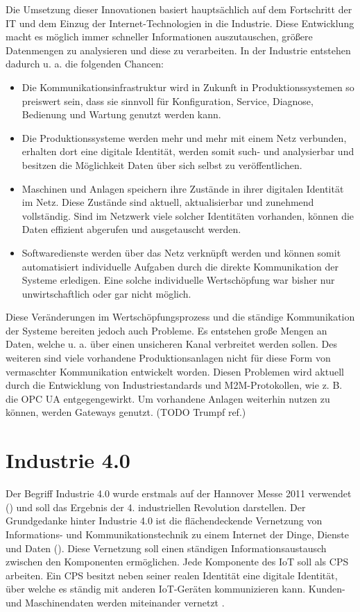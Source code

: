 Die Umsetzung dieser Innovationen basiert hauptsächlich auf dem Fortschritt der \ac{IT} und dem Einzug der Internet-Technologien in die Industrie. Diese Entwicklung macht es möglich immer schneller Informationen auszutauschen, größere Datenmengen zu analysieren und diese zu verarbeiten. In der Industrie entstehen dadurch u. a. die folgenden Chancen:

\begin{itemize}
  \item Die Kommunikationsinfrastruktur wird in Zukunft in Produktionssystemen so preiswert sein, dass sie sinnvoll für Konfiguration, Service, Diagnose, Bedienung und Wartung genutzt werden kann.
  \item Die Produktionssysteme werden mehr und mehr mit einem Netz verbunden, erhalten dort eine digitale Identität, werden somit such- und analysierbar und besitzen die Möglichkeit Daten über sich selbst zu veröffentlichen. 
  \item Maschinen und Anlagen speichern ihre Zustände in ihrer digitalen Identität im Netz. Diese Zustände sind aktuell, aktualisierbar und zunehmend vollständig. Sind im Netzwerk viele solcher Identitäten vorhanden, können die Daten effizient abgerufen und ausgetauscht werden.
  \item Softwaredienste werden über das Netz verknüpft werden und können somit automatisiert individuelle Aufgaben durch die direkte Kommunikation der Systeme erledigen. Eine solche individuelle Wertschöpfung war bisher nur unwirtschaftlich oder gar nicht möglich.
\end{itemize}

Diese Veränderungen im Wertschöpfungsprozess und die ständige Kommunikation der Systeme bereiten jedoch auch Probleme. Es entstehen große Mengen an Daten, welche u. a. über einen unsicheren Kanal verbreitet werden sollen. Des weiteren sind viele vorhandene Produktionsanlagen nicht für diese Form von vermaschter Kommunikation entwickelt worden. Diesen Problemen wird aktuell durch die Entwicklung von Industriestandards und \ac{M2M}-Protokollen, wie z. B. die \ac{OPC UA} entgegengewirkt. Um vorhandene Anlagen weiterhin nutzen zu können, werden Gateways genutzt. (TODO Trumpf ref.)

\section{Industrie 4.0}
Der Begriff Industrie 4.0 wurde erstmals auf der Hannover Messe 2011 verwendet (\cite{drath2014}) und soll das Ergebnis der 4. industriellen Revolution darstellen. Der Grundgedanke hinter Industrie 4.0 ist die flächendeckende Vernetzung von Informations- und Kommunikationstechnik zu einem Internet der Dinge, Dienste und Daten (\cite{Spath2013}). Diese Vernetzung soll einen ständigen Informationsaustausch zwischen den Komponenten ermöglichen. Jede Komponente des \ac{IoT} soll als \ac{CPS} arbeiten. Ein \ac{CPS} besitzt neben seiner realen Identität eine digitale Identität, über welche es ständig mit anderen \ac{IoT}-Geräten kommunizieren kann. Kunden- und Maschinendaten werden miteinander vernetzt \cite{rami2016}.

